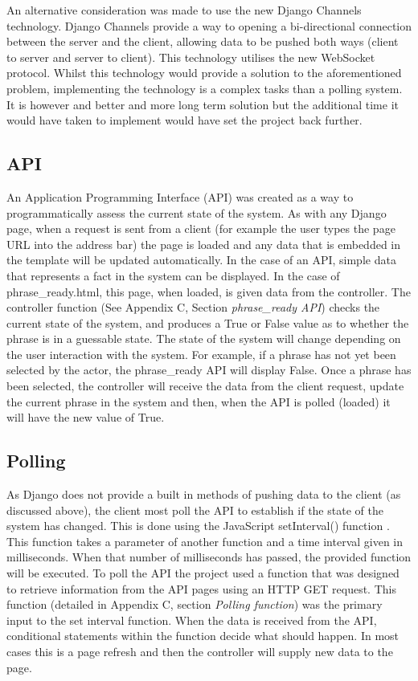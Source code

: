 An alternative consideration was made to use the new Django Channels technology. Django Channels provide a way to opening a bi-directional connection between the server and the client, allowing data to be pushed both ways (client to server and server to client)\cite{django_channels}. This technology utilises the new WebSocket protocol. Whilst this technology would provide a solution to the aforementioned problem, implementing the technology is a complex tasks than a polling system. It is however and better and more long term solution but the additional time it would have taken to implement would have set the project back further.

\subsection{API}
An Application Programming Interface (API) was created as a way to programmatically assess the current state of the system. As with any Django page, when a request is sent from a client (for example the user types the page URL into the address bar) the page is loaded and any data that is embedded in the template will be updated automatically. In the case of an API, simple data that represents a fact in the system can be displayed. In the case of phrase\_ready.html, this page, when loaded, is given data from the controller. The controller function (See Appendix C, Section \textit{phrase\_ready API}) checks the current state of the system, and produces a True or False value as to whether the phrase is in a guessable state. The state of the system will change depending on the user interaction with the system. For example, if a phrase has not yet been selected by the actor, the phrase\_ready API will display False. Once a phrase has been selected, the controller will receive the data from the client request, update the current phrase in the system and then, when the API is polled (loaded) it will have the new value of True.

\subsection{Polling}
As Django does not provide a built in methods of pushing data to the client (as discussed above), the client most poll the API to establish if the state of the system has changed. This is done using the JavaScript setInterval() function \cite{js_setinterval}. This function takes a parameter of another function and a time interval given in milliseconds. When that number of milliseconds has passed, the provided function will be executed. To poll the API the project used a function that was designed to retrieve information from the API pages using an HTTP GET request. This function (detailed in Appendix C, section \textit{Polling function}) was the primary input to the set interval function. When the data is received from the API, conditional statements within the function decide what should happen. In most cases this is a page refresh and then the controller will supply new data to the page.

